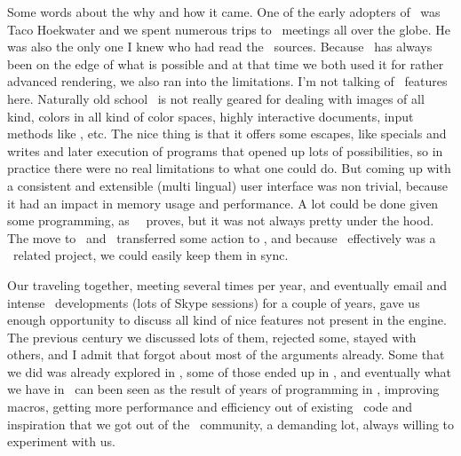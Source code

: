 \stopsection

\startsection[title=Rationale] %

Some words about the why and how it came. One of the early adopters of \CONTEXT\
was Taco Hoekwater and we spent numerous trips to \TEX\ meetings all over the
globe. He was also the only one I knew who had read the \TEX\ sources. Because
\CONTEXT\ has always been on the edge of what is possible and at that time we
both used it for rather advanced rendering, we also ran into the limitations. I'm
not talking of \TEX\ features here. Naturally old school \TEX\ is not really
geared for dealing with images of all kind, colors in all kind of color spaces,
highly interactive documents, input methods like \XML, etc. The nice thing is
that it offers some escapes, like specials and writes and later execution of
programs that opened up lots of possibilities, so in practice there were no real
limitations to what one could do. But coming up with a consistent and extensible
(multi lingual) user interface was non trivial, because it had an impact in
memory usage and performance. A lot could be done given some programming, as
\CONTEXT\ \MKII\ proves, but it was not always pretty under the hood. The move to
\LUATEX\ and \MKIV\ transferred some action to \LUA, and because \LUATEX\
effectively was a \CONTEXT\ related project, we could easily keep them in sync.

Our traveling together, meeting several times per year, and eventually email and
intense \LUATEX\ developments (lots of Skype sessions) for a couple of years,
gave us enough opportunity to discuss all kind of nice features not present in
the engine. The previous century we discussed lots of them, rejected some, stayed
with others, and I admit that forgot about most of the arguments already. Some
that we did was already explored in \type {eetex}, some of those ended up in
\LUATEX, and eventually what we have in \LUAMETATEX\ can been seen as the result
of years of programming in \TEX, improving macros, getting more performance and
efficiency out of existing \CONTEXT\ code and inspiration that we got out of the
\CONTEXT\ community, a demanding lot, always willing to experiment with us.


